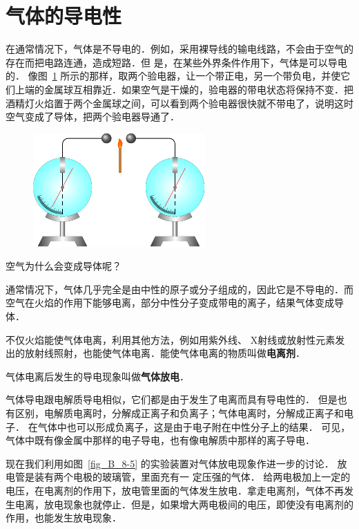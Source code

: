 \section{气体的导电性}
在通常情况下，气体是不导电的．例如，采用裸导线的输电线路，不会由于空气的存在而把电路连通，造成短路．但
是，在某些外界条件作用下，气体是可以导电的．
像图~\ref{fig_B_8-4} 所示的那样，取两个验电器，让一个带正电，另一个带负电，并使它们上端的金属球互相靠近．如果空气是干燥的，验电器的带电状态将保持不变．把酒精灯火焰置于两个金属球之间，可以看到两个验电器很快就不带电了，说明这时空气变成了导体，把两个验电器导通了．
\begin{figure}[htbp]
    \centering
    \includegraphics{fig/B/8-4.pdf}
    \caption{}\label{fig_B_8-4}
\end{figure}

空气为什么会变成导体呢？

通常情况下，气体几乎完全是由中性的原子或分子组成的，因此它是不导电的．而空气在火焰的作用下能够电离，部分中性分子变成带电的离子，结果气体变成导体．

不仅火焰能使气体电离，利用其他方法，例如用紫外线、
X射线或放射性元素发出的放射线照射，也能使气体电离．能使气体电离的物质叫做\textbf{电离剂}．

气体电离后发生的导电现象叫做\textbf{气体放电}．

气体导电跟电解质导电相似，它们都是由于发生了电离而具有导电性的．
但是也有区别，电解质电离时，分解成正离子和负离子；气体电离时，分解成正离子和电子．
在气体中也可以形成负离子，这是由于电子附在中性分子上的结果．
可见，气体中既有像金属中那样的电子导电，也有像电解质中那样的离子导电．

现在我们利用如图~\ref{fig_B_8-5} 的实验装置对气体放电现象作进一步的讨论．
放电管是装有两个电极的玻璃管，里面充有一
定压强的气体．
给两电极加上一定的电压，在电离剂的作用下，放电管里面的气体发生放电．拿走电离剂，气体不再发生电离，放电现象也就停止．但是，如果增大两电极间的电压，即使没有电离剂的作用，也能发生放电现象．

